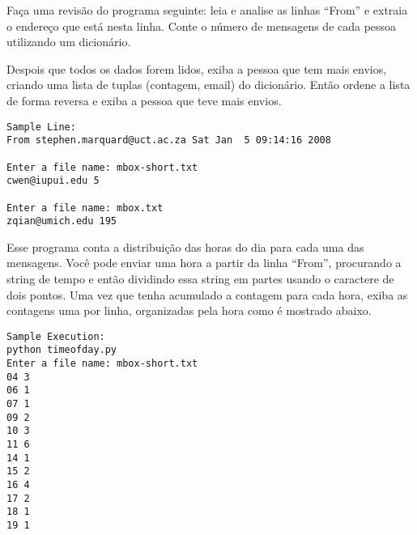 \begin{ex}
Faça uma revisão do programa seguinte: leia e analise as linhas ``From'' e
extraia o endereço que está nesta linha. Conte o número de mensagens de cada
pessoa utilizando um dicionário.

Despois que todos os dados forem lidos, exiba a pessoa que tem mais envios,
criando uma lista de tuplas (contagem, email) do dicionário. Então ordene a
lista de forma reversa e exiba a pessoa que teve mais envios.

\beforeverb
\begin{verbatim}
Sample Line:
From stephen.marquard@uct.ac.za Sat Jan  5 09:14:16 2008

Enter a file name: mbox-short.txt
cwen@iupui.edu 5

Enter a file name: mbox.txt
zqian@umich.edu 195
\end{verbatim}
\afterverb
\end{ex}

\begin{ex}
Esse programa conta a distribuição das horas do dia para cada uma das
mensagens. Você pode enviar uma hora a partir da linha ``From'', procurando
a string de tempo e então dividindo essa string em partes usando o caractere
de dois pontos. Uma vez que tenha acumulado a contagem para cada hora, exiba
as contagens uma por linha, organizadas pela hora como é mostrado abaixo.
\beforeverb
\begin{verbatim}
Sample Execution:
python timeofday.py
Enter a file name: mbox-short.txt
04 3
06 1
07 1
09 2
10 3
11 6
14 1
15 2
16 4
17 2
18 1
19 1
\end{verbatim}
\afterverb
\end{ex}


